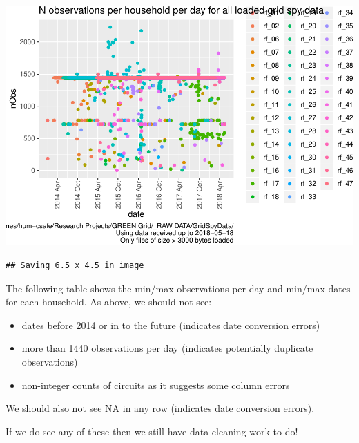 \documentclass[]{article}
\providecommand{\tightlist}{%
  \setlength{\itemsep}{0pt}\setlength{\parskip}{0pt}}
\begin{document}
\includegraphics{processNZGGElecCons1minData_files/figure-latex/loadedFilesObsPlots-2.pdf}

\begin{verbatim}
## Saving 6.5 x 4.5 in image
\end{verbatim}

The following table shows the min/max observations per day and min/max
dates for each household. As above, we should not see:

\begin{itemize}
\tightlist
\item
  dates before 2014 or in to the future (indicates date conversion
  errors)
\item
  more than 1440 observations per day (indicates potentially duplicate
  observations)
\item
  non-integer counts of circuits as it suggests some column errors
\end{itemize}

We should also not see NA in any row (indicates date conversion errors).

If we do see any of these then we still have data cleaning work to do!
\end{document}

